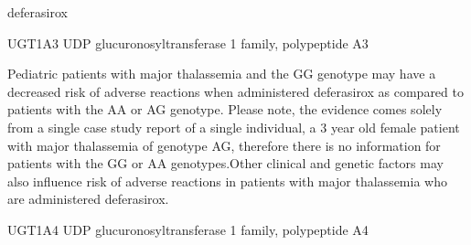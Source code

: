 \documentclass{resume} %
\begin{document}
\begin{rSection}{ deferasirox }
\begin{rSubsection}{ UGT1A3 }{ UDP glucuronosyltransferase 1 family, polypeptide A3 }{}{}
\item[] Pediatric patients with major thalassemia and the GG genotype may have a decreased risk of adverse reactions when administered deferasirox as compared to patients with the AA or AG genotype. Please note, the evidence comes solely from a single case study report of a single individual, a 3 year old female patient with major thalassemia of genotype AG, therefore there is no information for patients with the GG or AA genotypes.Other clinical and genetic factors may also influence risk of adverse reactions in patients with major thalassemia who are administered deferasirox.
\end{rSubsection}\begin{rSubsection}{ UGT1A4 }{ UDP glucuronosyltransferase 1 family, polypeptide A4 }{}{}
\item[]


\end{rSubsection}
\end{rSection}
\end{document}
